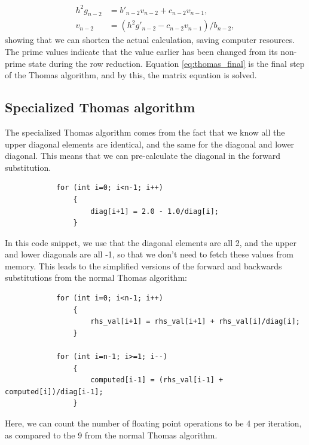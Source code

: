 \documentclass{emulateapj}
\begin{document}
        \begin{align}
            h^2g_{n-2} &= b'_{n-2}v_{n-2} + c_{n-2}v_{n-1}, \nonumber
            \\ \label{eq:thomas_final}
            v_{n-2} &= (h^2g'_{n-2} - c_{n-2}v_{n-1})/b_{n-2},
        \end{align}{}
        showing that we can shorten the actual calculation, saving computer resources. The prime values indicate that the value earlier has been changed from its non-prime state during the row reduction. Equation \ref{eq:thomas_final} is the final step of the Thomas algorithm, and by this, the matrix equation is solved.
        
    \subsection{Specialized Thomas algorithm}
    \label{sec:special_thomas}
    
        The specialized Thomas algorithm comes from the fact that we know all the upper diagonal elements are identical, and the same for the diagonal and lower diagonal. This means that we can pre-calculate the diagonal in the forward substitution.
        
        \begin{lstlisting}
            for (int i=0; i<n-1; i++)
                {
                    diag[i+1] = 2.0 - 1.0/diag[i];
                }
        \end{lstlisting}{}
        In this code snippet, we use that the diagonal elements are all 2, and the upper and lower diagonals are all -1, so that we don't need to fetch these values from memory. This leads to the simplified versions of the forward and backwards substitutions from the normal Thomas algorithm:
        
        \begin{lstlisting}
            for (int i=0; i<n-1; i++)
                {
                    rhs_val[i+1] = rhs_val[i+1] + rhs_val[i]/diag[i];
                }
                
            for (int i=n-1; i>=1; i--)
                {
                    computed[i-1] = (rhs_val[i-1] + computed[i])/diag[i-1];
                }
        \end{lstlisting}{}
        Here, we can count the number of floating point operations to be 4 per iteration, as compared to the 9 from the normal Thomas algorithm.
    
\end{document}
